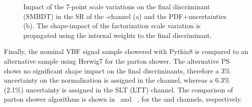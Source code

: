 \begin{figure}[htbp]
  \centering


  \caption{Impact of the 7-point scale variations on the final
    discriminant (SMBDT) in the SR of the \hadhad-channel (a) and the
    PDF+\alphas uncertainties (b). The shape-impact of the
    factorization scale variation is propagated using the internal
    weights to the final discriminant.}
  \label{fig:vbf_uncertainties_scale_pdf}
\end{figure}

Finally, the nominal VBF signal sample showered with Pythia8 is
compared to an alternative sample using Herwig7 for the parton
shower. The alternative PS shows no significant
shape impact on the final discriminants, therefore a 3\% uncertainty
on the normalisation is assigned in the \hadhad channel, whereas a 6.3\% (2.1\%) uncertainty 
is assigned in the SLT (LTT) \lephad channel. The comparison of parton shower
algorithms is shown in~ and ~, 
for the \hadhad and \lephad channels, respectively.

